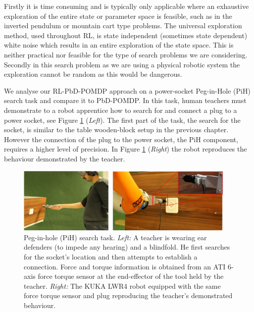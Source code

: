 Firstly it is time consuming and is typically only applicable where an exhaustive exploration 
of the entire state or parameter space is feasible, such as in the inverted pendulum or mountain cart type problems. 
The universal exploration method, used throughout RL, is state independent (sometimes state dependent) white noise 
which results in an entire exploration of the state space. This
is neither practical nor feasible for the type of search problems we are considering. Secondly in this search 
problem as we are using a physical robotic system the exploration cannot be random as this would be dangerous.


We analyse our RL-PbD-POMDP approach on a power-socket Peg-in-Hole (PiH) search task and compare it to PbD-POMDP. In this task, human teachers must demonstrate 
to a robot apprentice how to search for and connect a plug to a power socket, see Figure \ref{fig:experiment_setup} (\textit{Left}). 
The first part of the task, the search for the socket, is similar to the table wooden-block setup in the previous chapter. 
However the connection of the plug to the power socket, the PiH component, requires a higher level of precision.
In Figure \ref{fig:experiment_setup} (\textit{Right}) the robot reproduces the behaviour demonstrated by the teacher.

\begin{figure}[h]
  \centering
  \includegraphics[width=0.95\textwidth]{./ch4-PiH/Figures/Fig/human_example_search.pdf}
  \caption{Peg-in-hole (PiH) search task. \textit{Left:} A teacher is wearing ear defenders (to impede any hearing) and 
  a blindfold. He first searches for the socket's location and then attempts to establish a connection. Force 
  and torque information is obtained from an ATI 6-axis force torque sensor at the end-effector of the tool held by the teacher.
  \textit{Right:} The KUKA LWR4 robot equipped with the same force torque sensor and plug reproducing the teacher's demonstrated behaviour.}
  \label{fig:experiment_setup}
\end{figure}


